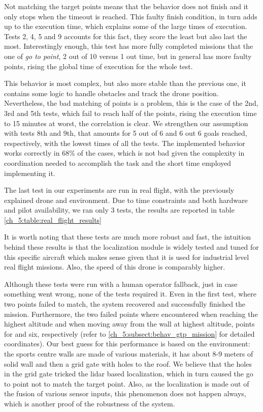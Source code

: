   Not matching the target points means that the behavior does not finish and it only stops when the timeout is reached. This faulty finish condition, in turn adds up to the execution time, which explains some of the large times of execution. Tests 2, 4, 5 and 9 accounts for this fact, they score the least but also last the most. Interestingly enough, this test has more fully completed missions that the one of \textit{go to point}, 2 out of 10 versus 1 out time, but in general has more faulty points, rising the global time of execution for the whole test.

  

  This behavior is most complex, but also more stable than the previous one, it contains some logic to handle obstacles and track the drone position. Nevertheless, the bad matching of points is a problem, this is the case of the 2nd, 3rd and 5th tests, which fail to reach half of the points, rising the execution time to 15 minutes at worst, the correlation is clear. We strengthen our assumption with tests 8th and 9th, that amounts for 5 out of 6 and 6 out 6 goals reached, respectively, with the lowest times of all the tests. The implemented behavior works correctly in 68\% of the cases, which is not bad given the complexity in coordination needed to accomplish the task and the short time employed implementing it.

  The last test in our experiments are run in real flight, with the previously explained drone and environment. Due to time constraints and both hardware and pilot availability, we ran only 3 tests, the results are reported in table \ref{ch_5:table:real_flight_results}

  

  It is worth noting that these tests are much more robust and fast, the intuition behind these results is that the localization module is widely tested and tuned for this specific aircraft which makes sense given that it is used for industrial level real flight missions. Also, the speed of this drone is comparably higher.

  Although these tests were run with a human operator fallback, just in case something went wrong, none of the tests required it. Even in the first test, where two points failed to match, the system recovered and successfully finished the mission. Furthermore, the two failed points where encountered when reaching the highest altitude and when moving away from the wall at highest altitude, points for and six, respectively (refer to \ref{ch_5:subsect:behav_gtp_mission} for detailed coordinates). Our best guess for this performance is based on the environment: the sports centre walls are made of various materials, it has about 8-9 meters of solid wall and then a grid gate with holes to the roof. We believe that the holes in the grid gate tricked the lidar based localization, which in turn caused the go to point not to match the target point. Also, as the localization is made out of the fusion of various sensor inputs, this phenomenon does not happen always, which is another proof of the robustness of the system.

